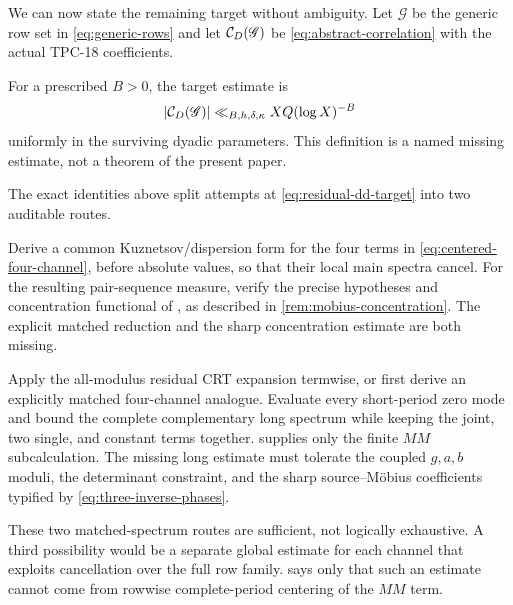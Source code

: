 We can now state the remaining target without ambiguity.  Let
\(\mathscr G\) be the generic row set in \eqref{eq:generic-rows} and
let \(\mathcal C_D(\mathscr G)\) be \eqref{eq:abstract-correlation} with the
actual TPC-18 coefficients.

\begin{definition}
\label{def:residual-dd}
For a prescribed \(B>0\), the target estimate is
\begin{equation}
 |\mathcal C_D(\mathscr G)|
 \ll_{B,h,\delta,\kappa}XQ(\log X)^{-B}
 \label{eq:residual-dd-target}
\end{equation}
uniformly in the surviving dyadic parameters.  This definition is a
named missing estimate, not a theorem of the present paper.
\end{definition}

The exact identities above split attempts at
\eqref{eq:residual-dd-target} into two auditable routes.

\begin{description}[leftmargin=2.1em,labelindent=0em,style=nextline]
\item[Direct determinant-frequency route.]
Derive a common Kuznetsov/dispersion form for the four terms in
\eqref{eq:centered-four-channel}, before absolute values, so that their
local main spectra cancel.  For the resulting pair-sequence measure,
verify the precise hypotheses and concentration functional of
\cite[Theorem~5.2]{Pascadi2026LargeSieve}, as described in
\cref{rem:mobius-concentration}.  The explicit matched reduction and
the sharp concentration estimate are both missing.

\item[CRT--Poisson long-lcm route.]
Apply the all-modulus residual CRT expansion termwise, or first derive
an explicitly matched four-channel analogue.  Evaluate every
short-period zero mode and bound the complete complementary long
spectrum while keeping the joint, two single, and constant terms
together.   supplies only the finite
\(MM\) subcalculation.  The missing long estimate must tolerate the
coupled \(g,a,b\) moduli, the determinant constraint, and the sharp
source--M\"obius coefficients typified by
\eqref{eq:three-inverse-phases}.
\end{description}

These two matched-spectrum routes are sufficient, not logically
exhaustive.  A third possibility would be a separate global estimate
for each channel that exploits cancellation over the full row family.
 says only that such an estimate cannot come
from rowwise complete-period centering of the \(MM\) term.

